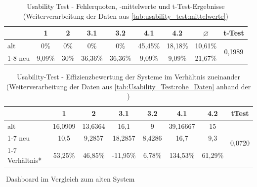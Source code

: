 \begin{table}[H]
    \centering
    \begin{tabular}{|l|c|c|c|c|c|c|c|c|}
    \hline
     & 1      & 2    & 3.1     & 3.2     & 4.1     & 4.2     & $\varnothing$ & t-Test                  \\ \hline
    alt     & 0\%    & 0\%  & 0\%     & 0\%     & 45,45\% & 18,18\% & 10,61\% & \multirow{2}{*}{0,1989} \\ \cline{1-8}
    neu     & 9,09\% & 30\% & 36,36\% & 36,36\% & 9,09\%  & 9,09\%  & 21,67\% &                         \\ \hline
    \end{tabular}
    \caption{Usability Test - Fehlerquoten, -mittelwerte und t-Test-Ergebnisse (Weiterverarbeitung der Daten aus \autoref{tab:usability_test:mittelwerte})}
    \label{tab:usability_test:Differenz+ttest_Fehler}
\end{table}  %

\begin{table}[H]
    \centering
    \begin{tabular}{|l|c|c|c|c|c|c|c|}
        \hline
            & 1 & 2 & 3.1 & 3.2 & 4.1 & 4.2 & tTest \\ \hline
        alt	& 16,0909 & 13,6364 & 16,1 & 9 & 39,16667 & 15 & \multirow{3}{*}{0,0720} \\ \cline{1-7}
        neu	& 10,5 & 9,2857 & 18,2857 & 8,4286 & 16,7 & 9,3	& \\ \cline{1-7}
        Verhältnis* & 53,25\% & 46,85\% & -11,95\% & 6,78\% & 134,53\% & 61,29\% & \\ \hline
    \end{tabular}
    \caption{Usability-Test - Effizienzbewertung der Systeme im Verhältnis zueinander (Weiterverarbeitung der Daten aus \autoref{tab:Usability_Test:rohe_Daten} anhand der )}
    \textcolor{white}{.}\hfill *Dashboard im Vergleich zum alten System
    \label{tab:usability_test:effizienz}
\end{table}
